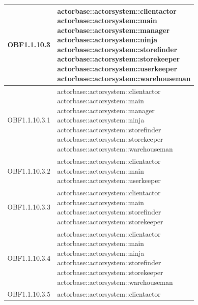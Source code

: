 \documentclass{scalatekids-article}
\begin{document}
\begin{longtable}[H]{|p{3.5cm}|p{7.5cm}|}
\hline
OBF1.1.10.3 & \multiLineCell[t]{actorbase::actorsystem::clientactor\\actorbase::actorsystem::main\\actorbase::actorsystem::manager\\actorbase::actorsystem::ninja\\actorbase::actorsystem::storefinder\\actorbase::actorsystem::storekeeper\\actorbase::actorsystem::userkeeper\\actorbase::actorsystem::warehouseman\\}\\
\hline
OBF1.1.10.3.1 & \multiLineCell[t]{actorbase::actorsystem::clientactor\\actorbase::actorsystem::main\\actorbase::actorsystem::manager\\actorbase::actorsystem::ninja\\actorbase::actorsystem::storefinder\\actorbase::actorsystem::storekeeper\\actorbase::actorsystem::warehouseman\\}\\
\hline
OBF1.1.10.3.2 & \multiLineCell[t]{actorbase::actorsystem::clientactor\\actorbase::actorsystem::main\\actorbase::actorsystem::userkeeper\\}\\
\hline
OBF1.1.10.3.3 & \multiLineCell[t]{actorbase::actorsystem::clientactor\\actorbase::actorsystem::main\\actorbase::actorsystem::storefinder\\actorbase::actorsystem::storekeeper\\}\\
\hline
OBF1.1.10.3.4 & \multiLineCell[t]{actorbase::actorsystem::clientactor\\actorbase::actorsystem::main\\actorbase::actorsystem::ninja\\actorbase::actorsystem::storefinder\\actorbase::actorsystem::storekeeper\\actorbase::actorsystem::warehouseman\\}\\
\hline
OBF1.1.10.3.5 & \multiLineCell[t]{actorbase::actorsystem::clientactor\\}\\

\end{longtable}
\end{document}
